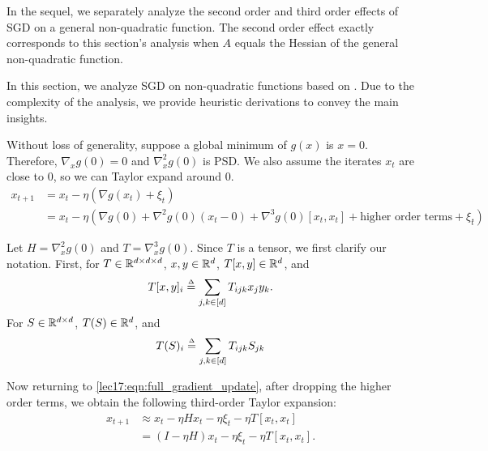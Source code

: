 
In the sequel, we separately analyze the second order and third order effects of SGD on a general non-quadratic function. The second order effect exactly corresponds to this section's analysis when $A$ equals the Hessian of the general non-quadratic function.


In this section, we analyze SGD on non-quadratic functions based on \cite{damian2021label}. Due to the complexity of the analysis, we provide heuristic derivations to convey the main insights. 

Without loss of generality, suppose a global minimum of $g(x)$ is $x=0$. Therefore, $\nabla_x g(0) = 0$ and $\nabla_x^2 g(0)$ is PSD. We also assume the iterates $x_t$ are close to $0$, so we can Taylor expand around $0$.
\begin{align}
x_{t+1} &= x_t - \eta(\nabla g(x_t) + \xi_t)\\
&= x_t - \eta(\nabla g(0) + \nabla^2g(0)(x_t - 0) + \nabla^3g(0)[x_t,x_t] + \text{higher order terms} + \xi_t). \label{lec17:eqn:full_gradient_update}
\end{align}

Let $H = \nabla^2_x g(0)$ and $T = \nabla^3_x g(0)$. Since $T$ is a tensor, we first clarify our notation. First, for $T \in \mathbb R^{d\times d\times d}$, $x,y \in \mathbb R^{d}$, $T[x,y]\in \mathbb R^d$, and 
\begin{align}
    T[x,y]_i \defeq \sum_{j,k\in[d]}T_{ijk}x_jy_k.
\end{align} 
For $S\in \mathbb R^{d\times d}$, $T(S)\in \mathbb R^d$, and 
\begin{align} 
    T(S)_i \defeq \sum_{j,k\in[d]}T_{ijk}S_{jk}
\end{align} 

Now returning to \eqref{lec17:eqn:full_gradient_update}, after dropping the higher order terms, we obtain the following third-order Taylor expansion:
\begin{align}
x_{t+1} &\approx x_t - \eta Hx_t - \eta\xi_t - \eta T[x_t,x_t]\\
&= (I-\eta H)x_t - \eta \xi_t - \eta T [x_t,x_t].\label{lec17:eqn:iterate}
\end{align}


